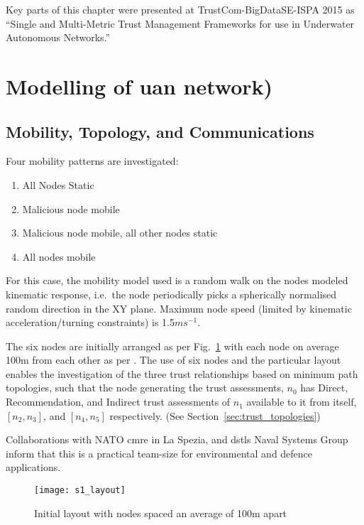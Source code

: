 Key parts of this chapter were presented at TrustCom-BigDataSE-ISPA 2015 as ``Single and Multi-Metric Trust Management Frameworks for use in Underwater Autonomous Networks.''\cite{Bolster2015}

\section{Modelling of \gls{uan} network)\label{sec:initialsystemcharacterization}}


\subsection{Mobility, Topology, and Communications}

Four mobility patterns are investigated:
\begin{enumerate}
	\item All Nodes Static
	\item Malicious node mobile
	\item Malicious node mobile, all other nodes static
	\item All nodes mobile
\end{enumerate}

For this case, the mobility model used is a random walk on the nodes modeled kinematic response, i.e.\ the node periodically picks a spherically normalised random direction in the XY plane.
Maximum node speed (limited by kinematic acceleration/turning constraints) is 1.5$ms^{-1}$.


The six nodes are initially arranged as per Fig.~\ref{fig:s1_layout} with each node on average 100m from each other as per \cite{Guo11}.
The use of six nodes and the particular layout enables the investigation of the three trust relationships based on minimum path topologies, such that the node generating the trust assessments, $n_0$ has Direct, Recommendation, and Indirect trust assessments of $n_1$ available to it from itself, $[n_2,n_3]$, and $[n_4,n_5]$ respectively. 
(See Section~\ref{sec:trust_topologies})

Collaborations with NATO \gls{cmre} in La Spezia, and \glspl{dstl} Naval Systems Group inform that this is a practical team-size for environmental and defence applications.

%
\begin{figure}[h]
	\centering
	\texttt{[image: s1\_layout]}
	\caption{Initial layout with nodes spaced an average of 100m apart}
	\label{fig:s1_layout}
\end{figure}
%

